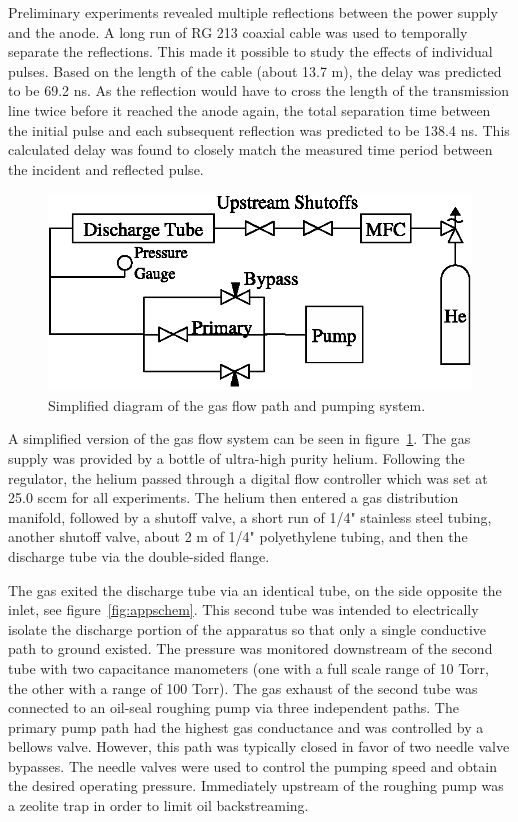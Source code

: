 Preliminary experiments revealed multiple reflections between the power supply
and the anode. A long run of RG 213 coaxial cable was used to temporally
separate the reflections. This made it possible to study the effects of
individual pulses. Based on the length of the cable (about 13.7 m), the delay
was predicted to be 69.2 ns. As the reflection would have to cross the length of
the transmission line twice before it reached the anode again, the total
separation time between the initial pulse and each subsequent reflection was
predicted to be 138.4 ns. This calculated delay was found to closely match the
measured time period between the incident and reflected pulse.

\begin{figure}
  \centering
  \includegraphics{./chapters/experiment/figures/pump.eps}
  \caption{Simplified diagram of the gas flow path and pumping system.}
  \label{fig:pump}
\end{figure}
A simplified version of the gas flow system can be seen in
figure~\ref{fig:pump}. The gas supply was provided by a bottle of ultra-high
purity helium. Following the regulator, the helium passed through a digital flow
controller which was set at 25.0 sccm for all experiments. The helium then
entered a gas distribution manifold, followed by a shutoff valve, a short run of
1/4" stainless steel tubing, another shutoff valve, about 2 m of 1/4"
polyethylene tubing, and then the discharge tube via the double-sided flange. 

The gas exited the discharge tube via an identical tube, on the side opposite
the inlet, see figure~\ref{fig:appschem}. This second tube was intended to
electrically isolate the discharge portion of the apparatus so that only a
single conductive path to ground existed. The pressure was monitored downstream
of the second tube with two capacitance manometers (one with a full scale range
of 10 Torr, the other with a range of 100 Torr). The gas exhaust of the second
tube was connected to an oil-seal roughing pump via three independent paths. The
primary pump path had the highest gas conductance and was controlled by a
bellows valve. However, this path was typically closed in favor of two needle
valve bypasses. The needle valves were used to control the pumping speed and
obtain the desired operating pressure. Immediately upstream of the roughing pump
was a zeolite trap in order to limit oil backstreaming.

